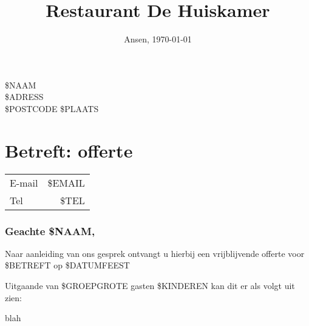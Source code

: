 \documentclass{scrartcl}
\begin{document}

\title{Restaurant De Huiskamer}
\date{Ansen, \today}
\maketitle
\thispagestyle{footer}

\begin{flushright}
	\$NAAM \\
	\$ADRESS \\
	\$POSTCODE \$PLAATS
\end{flushright}
\section*{Betreft: offerte}
\begin{tabular}{ l r }
  E-mail & \$EMAIL  \\
  Tel & \$TEL  \\
\end{tabular}


\subsubsection*{Geachte \$NAAM,}

Naar aanleiding van ons gesprek ontvangt u hierbij een vrijblijvende offerte
voor \$BETREFT op \$DATUMFEEST

Uitgaande van \$GROEPGROTE gasten \$KINDEREN kan dit er als volgt uit zien:

\newpage
blah
\end{document}
